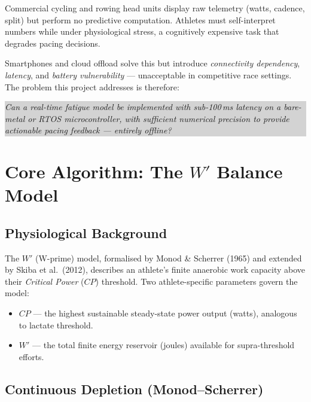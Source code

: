 \documentclass[11pt, letterpaper]{article}
\begin{document}
Commercial cycling and rowing head units display raw telemetry (watts, cadence, split) but
perform no predictive computation. Athletes must self-interpret numbers while under physiological
stress, a cognitively expensive task that degrades pacing decisions.

Smartphones and cloud offload solve this but introduce \textit{connectivity dependency},
\textit{latency}, and \textit{battery vulnerability} --- unacceptable in competitive race
settings. The problem this project addresses is therefore:

\begin{center}
  \colorbox{lightgray}{\parbox{0.88\linewidth}{
      \vspace{0.4em}
      \textit{Can a real-time fatigue model be implemented with sub-100\,ms latency on a
        bare-metal or RTOS microcontroller, with sufficient numerical precision to provide
      actionable pacing feedback --- entirely offline?}
      \vspace{0.4em}
  }}
\end{center}

\section{Core Algorithm: The \texorpdfstring{$W'$}{W-Prime} Balance Model}

\subsection{Physiological Background}

The $W'$ (W-prime) model, formalised by Monod \& Scherrer (1965) and extended by Skiba et al.\
(2012), describes an athlete's finite anaerobic work capacity above their \textit{Critical Power}
($CP$) threshold.  Two athlete-specific parameters govern the model:

\begin{itemize}
  \item $CP$ --- the highest sustainable steady-state power output (watts), analogous to
    lactate threshold.
  \item $W'$ --- the total finite energy reservoir (joules) available for supra-threshold
    efforts.
\end{itemize}

\subsection{Continuous Depletion (Monod--Scherrer)}
\end{document}
